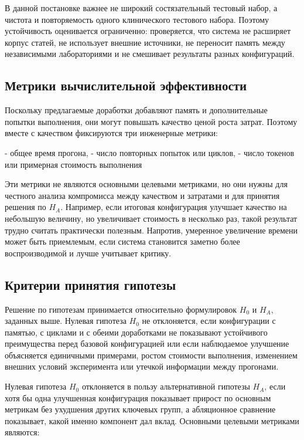 В данной постановке важнее не широкий состязательный тестовый набор, а чистота и повторяемость одного клинического тестового набора. Поэтому устойчивость оценивается ограниченно: проверяется, что система не расширяет корпус статей, не использует внешние источники, не переносит память между независимыми лабораториями и не смешивает результаты разных конфигураций.

\subsection{Метрики вычислительной эффективности}

Поскольку предлагаемые доработки добавляют память и дополнительные попытки выполнения, они могут повышать качество ценой роста затрат. Поэтому вместе с качеством фиксируются три инженерные метрики:

- общее время прогона,
- число повторных попыток или циклов,
- число токенов или примерная стоимость выполнения

Эти метрики не являются основными целевыми метриками, но они нужны для честного анализа компромисса между качеством и затратами и для принятия решения по $H_A$. Например, если итоговая конфигурация улучшает качество на небольшую величину, но увеличивает стоимость в несколько раз, такой результат трудно считать практически полезным. Напротив, умеренное увеличение времени может быть приемлемым, если система становится заметно более воспроизводимой и лучше учитывает критику.

\subsection{Критерии принятия гипотезы}

Решение по гипотезам принимается относительно формулировок $H_0$ и $H_A$, заданных выше. Нулевая гипотеза $H_0$ не отклоняется, если конфигурации с памятью, с циклами и с обеими доработками не показывают устойчивого преимущества перед базовой конфигурацией или если наблюдаемое улучшение объясняется единичными примерами, ростом стоимости выполнения, изменением внешних условий эксперимента или утечкой информации между прогонами.

Нулевая гипотеза $H_0$ отклоняется в пользу альтернативной гипотезы $H_A$, если хотя бы одна улучшенная конфигурация показывает прирост по основным метрикам без ухудшения других ключевых групп, а абляционное сравнение показывает, какой именно компонент дал вклад. Основными целевыми метриками являются:

